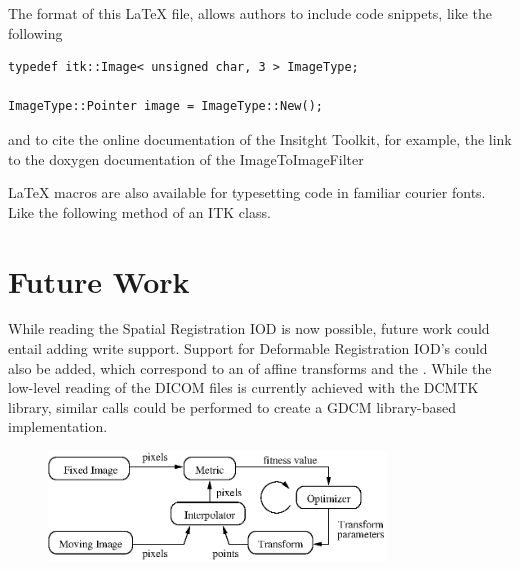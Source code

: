\documentclass{InsightArticle}
\begin{document}
The format of this LaTeX file, allows authors to include code snippets, like
the following

\small
\begin{verbatim}
typedef itk::Image< unsigned char, 3 > ImageType;

ImageType::Pointer image = ImageType::New();
\end{verbatim}
\normalsize

and to cite the online documentation of the Insitght Toolkit, for example, the
link to the doxygen documentation of the ImageToImageFilter


LaTeX macros are also available for typesetting code in familiar courier fonts.
Like the following method of an ITK class.


\section{Future Work}

While reading the Spatial Registration IOD is now possible, future work could
entail adding write support. Support for Deformable Registration IOD's could
also be added, which correspond to an  of affine
transforms and the .  While the low-level
reading of the DICOM files is currently achieved with the DCMTK library, similar
calls could be performed to create a GDCM library-based implementation.





%
%

\begin{figure}
\center
\includegraphics[width=0.8\textwidth]{RegistrationComponentsDiagram.eps}
\label{fig:RegistrationComponents}
\end{figure}
\end{document}
